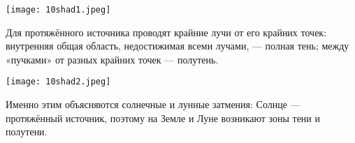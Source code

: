 \documentclass[12pt, a4paper]{article}%
\begin{document}
\begin{center}
\texttt{[image: 10shad1.jpeg]}
\label{fig:mpr}
\end{center}

Для протяжённого источника проводят крайние лучи от его крайних точек: внутренняя общая область, недостижимая всеми лучами, — полная тень; между «пучками» от разных крайних точек — полутень.

\begin{center}
\texttt{[image: 10shad2.jpeg]}
\label{fig:mpr}
\end{center}

Именно этим объясняются солнечные и лунные затмения: Солнце — протяжённый источник, поэтому на Земле и Луне возникают зоны тени и полутени.
\end{document}
